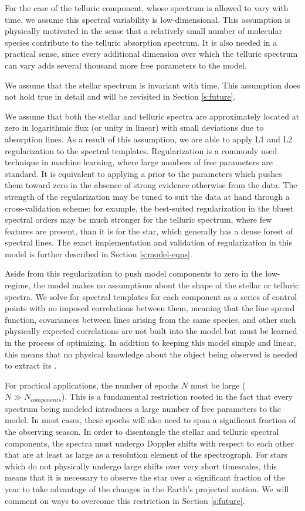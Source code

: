 \documentclass[modern]{aastex62}
\begin{document}
For the case of the telluric component, whose spectrum is allowed to vary with time, we assume this spectral variability is low-dimensional. 
This assumption is physically motivated in the sense that a relatively small number of molecular species contribute to the telluric absorption spectrum. 
It is also needed in a practical sense, since every additional dimension over which the telluric spectrum can vary adds several thousand more free parameters to the model.

We assume that the stellar spectrum is invariant with time. 
This assumption does not hold true in detail and will be revisited in Section \ref{s:future}. 

We assume that both the stellar and telluric spectra are approximately located at zero in logarithmic flux (or unity in linear) with small deviations due to absorption lines. 
As a result of this assumption, we are able to apply L1 and L2 regularization to the spectral templates. 
Regularization is a commonly used technique in machine learning, where large numbers of free parameters are standard. 
It is equivalent to applying a prior to the parameters which pushes them toward zero in the absence of strong evidence otherwise from the data. 
The strength of the regularization may be tuned to suit the data at hand through a cross-validation scheme: for example, the best-suited regularization in the bluest spectral orders may be much stronger for the telluric spectrum, where few features are present, than it is for the star, which generally has a dense forest of spectral lines. 
The exact implementation and validation of regularization in this model is further described in Section \ref{s:model-eqns}.

Aside from this regularization to push model components to zero in the low-\SNR regime, the model makes no assumptions about the shape of the stellar or telluric spectra. 
We solve for spectral templates for each component as a series of control points with no imposed correlations between them, meaning that the line spread function, covariances between lines arising from the same species, and other such physically expected correlations are not built into the model but must be learned in the process of optimizing. 
In addition to keeping this model simple and linear, this means that no physical knowledge about the object being observed is needed to extract its \RVs.

For practical applications, the number of epochs $N$ must be large ($N \gg N_{components}$). 
This is a fundamental restriction rooted in the fact that every spectrum being modeled introduces a large number of free parameters to the model. 
In most cases, these epochs will also need to span a significant fraction of the observing season. 
In order to disentangle the stellar and telluric spectral components, the spectra must undergo Doppler shifts with respect to each other that are at least as large as a resolution element of the spectrograph. 
For stars which do not physically undergo large \RV shifts over very short timescales, this means that it is necessary to observe the star over a significant fraction of the year to take advantage of the changes in the Earth's projected motion. 
We will comment on ways to overcome this restriction in Section \ref{s:future}.
\end{document}
